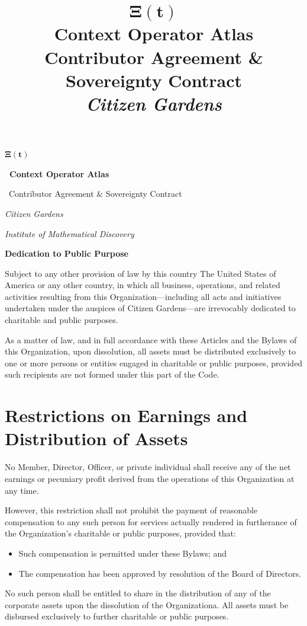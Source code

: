 \documentclass[12pt]{article}
\title{\Huge$\boldsymbol{\Xi(t)}$\\[1cm] \Huge\bfseries Context Operator Atlas \\[0.5cm] \LARGE Contributor Agreement \& Sovereignty Contract \\[0.5cm] \Huge \textit{Citizen Gardens}}
\date{}
\begin{document}
\begin{titlepage}
    \centering
    \vspace*{3cm}
    {\Huge$\boldsymbol{\Xi(t)}$}
    \vspace*{1cm}

    {\Huge\bfseries\ Context Operator Atlas \par}
    \vspace{0.5cm}
    {\LARGE\ Contributor Agreement \& Sovereignty Contract \par}
    \vspace{0.8cm}
    {\Huge \textit{Citizen Gardens}}\\
    \vspace{0.4cm}
    {\Large\itshape Institute of Mathematical Discovery \par}
    \vfill

    {\bfseries Dedication to Public Purpose \par}
    \vspace{1em}
    \small
    Subject to any other provision of law by this country The United States of America or any other country, in which all business, operations, and related activities resulting from this Organization---including all acts and initiatives undertaken under the auspices of Citizen Gardens---are irrevocably dedicated to charitable and public purposes.

    As a matter of law, and in full accordance with these Articles and the Bylaws of this Organization, upon dissolution, all assets must be distributed exclusively to one or more persons or entities engaged in charitable or public purposes, provided such recipients are not formed under this part of the Code.

    \section*{Restrictions on Earnings and Distribution of Assets}
    No Member, Director, Officer, or private individual shall receive any of the net earnings or pecuniary profit derived from the operations of this Organization at any time.

    However, this restriction shall not prohibit the payment of reasonable compensation to any such person for services actually rendered in furtherance of the Organization’s charitable or public purposes, provided that:
    \begin{itemize}
        \item Such compensation is permitted under these Bylaws; and
        \item The compensation has been approved by resolution of the Board of Directors.
    \end{itemize}
    No such person shall be entitled to share in the distribution of any of the corporate assets upon the dissolution of the Organizationa. All assets must be disbursed exclusively to further charitable or public purposes.
\end{titlepage}
\end{document}
